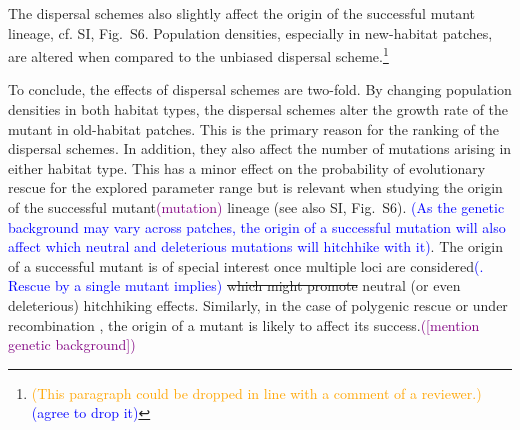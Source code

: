 \documentclass[a4paper,11pt]{article}
\newcommand{\florence}[1]{\textcolor{purple}{(#1)}} %
\newcommand{\francois}[1]{\textcolor{blue}{(#1)}}
\newcommand{\pete}[1]{\textcolor{orange}{(#1)}}
\newcommand{\chg}[1]{\textcolor{change}{#1}}
\begin{document}
The dispersal schemes also slightly affect the origin of the successful mutant lineage, cf. SI, Fig.~S6. Population densities, especially in new-habitat patches, are altered when compared to the \chg{unbiased} dispersal scheme.\footnote{\pete{This paragraph could be dropped in line with a comment of a reviewer.} \francois{agree to drop it}}

To conclude, the effects of dispersal schemes are two-fold. By changing population densities in both habitat types, the dispersal schemes \chg{alter} the growth rate of the mutant in old-habitat patches. 
This is the primary reason for the ranking of the dispersal schemes. In addition, they also affect the number of mutations arising in either habitat type. This has a minor effect on the probability of evolutionary rescue for the explored parameter range but is relevant when studying the origin of the successful mutant\florence{mutation} lineage \chg{(see also SI, Fig.~S6)}. \francois{As the genetic background may vary across patches, the origin of a successful mutation will also affect which neutral and deleterious mutations will hitchhike with it}. \chg{The origin of a successful mutant is of special interest once multiple loci are considered\francois{. Rescue by a single mutant implies} \st{which might promote} neutral (or even deleterious) hitchhiking effects. Similarly, in the case of polygenic rescue or under recombination \citep[e.g.][]{uecker_2015}, the origin of a mutant is likely to affect its success.}\florence{[mention genetic background]}    

\end{document}
